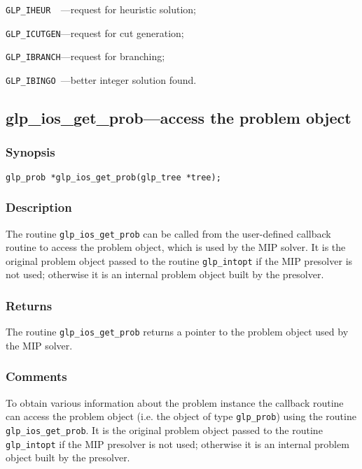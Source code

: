 \verb|GLP_IHEUR  |---request for heuristic solution;

\verb|GLP_ICUTGEN|---request for cut generation;

\verb|GLP_IBRANCH|---request for branching;

\verb|GLP_IBINGO |---better integer solution found.

\subsection{glp\_ios\_get\_prob---access the problem object}

\subsubsection*{Synopsis}

\begin{verbatim}
glp_prob *glp_ios_get_prob(glp_tree *tree);
\end{verbatim}

\subsubsection*{Description}

The routine \verb|glp_ios_get_prob| can be called from the user-defined
callback routine to access the problem object, which is used by the MIP
solver. It is the original problem object passed to the routine
\verb|glp_intopt| if the MIP presolver is not used; otherwise it is an
internal problem object built by the presolver.

\subsubsection*{Returns}

The routine \verb|glp_ios_get_prob| returns a pointer to the problem
object used by the MIP solver.

\subsubsection*{Comments}

To obtain various information about the problem instance the callback
routine can access the problem object (i.e. the object of type
\verb|glp_prob|) using the routine \verb|glp_ios_get_prob|. It is the
original problem object passed to the routine \verb|glp_intopt| if the
MIP presolver is not used; otherwise it is an internal problem object
built by the presolver.

